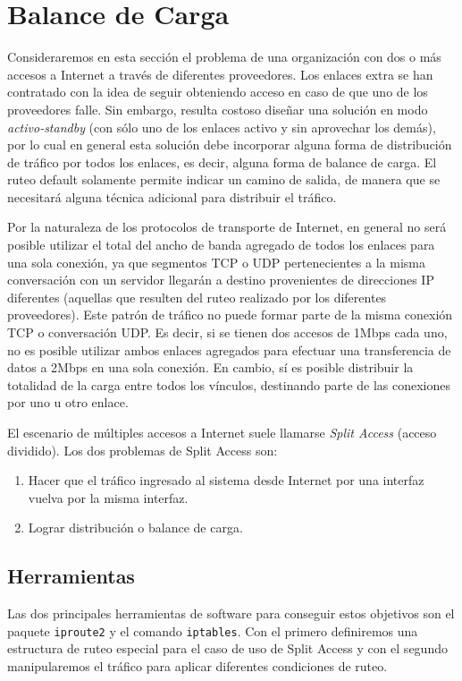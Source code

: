 \section{Balance de Carga}


Consideraremos en esta sección el problema de una organización con dos o más accesos a Internet a través de diferentes proveedores. Los enlaces extra se han contratado con la idea de seguir obteniendo acceso en caso de que uno de los proveedores falle. Sin embargo, resulta costoso diseñar una solución en modo \textit{activo-standby} (con sólo uno de los enlaces activo y sin aprovechar los demás), por lo cual en general esta solución debe incorporar alguna forma de distribución de tráfico por todos los enlaces, es decir, alguna forma de balance de carga. El ruteo default solamente permite indicar un camino de salida, de manera que se necesitará alguna técnica adicional para distribuir el tráfico.

Por la naturaleza de los protocolos de transporte de Internet, en general no será posible utilizar el total del ancho de banda agregado de todos los enlaces para una sola conexión, ya que segmentos TCP o UDP pertenecientes a la misma conversación con un servidor llegarán a destino provenientes de direcciones IP diferentes (aquellas que resulten del ruteo realizado por los diferentes proveedores). Este patrón de tráfico no puede formar parte de la misma conexión TCP o conversación UDP. Es decir, si se tienen dos accesos de 1Mbps cada uno, no es posible utilizar ambos enlaces agregados para efectuar una transferencia de datos a 2Mbps en una sola conexión. En cambio, sí es posible distribuir la totalidad de la carga entre todos los vínculos, destinando parte de las conexiones por uno u otro enlace. 

El escenario de múltiples accesos a Internet suele llamarse \textit{Split Access} (acceso dividido). Los dos problemas de Split Access son:

\begin{enumerate}
	\item Hacer que el tráfico ingresado al sistema desde Internet por una interfaz vuelva por la misma interfaz.
	\item Lograr distribución o balance de carga.
\end{enumerate}

\subsection{Herramientas}
Las dos principales herramientas de software para conseguir estos objetivos son el paquete \texttt{iproute2} y el comando \texttt{iptables}. Con el primero definiremos una estructura de ruteo especial para el caso de uso de Split Access y con el segundo manipularemos el tráfico para aplicar diferentes condiciones de ruteo.

